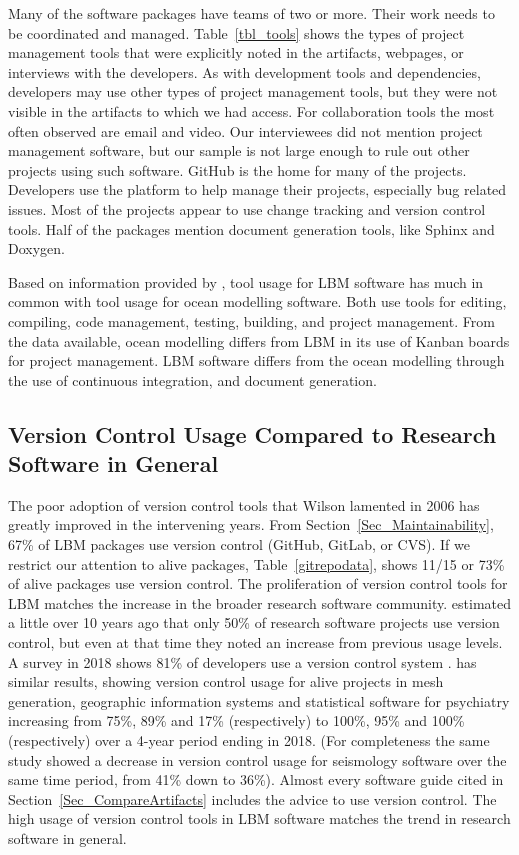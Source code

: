 \documentclass[final, 3p, times, authoryear]{elsarticle}
\begin{document}
Many of the software packages have teams of two or more. Their work needs to be
coordinated and managed. Table~\ref{tbl_tools} shows the types of project
management tools that were explicitly noted in the artifacts, webpages, or
interviews with the developers. As with development tools and dependencies,
developers may use other types of project management tools, but they were not
visible in the artifacts to which we had access.  For collaboration tools the
most often observed are email and video. Our interviewees did not mention
project management software, but our sample is not large enough to rule out
other projects using such software. GitHub is the home for many of the projects.
Developers use the platform to help manage their projects, especially bug
related issues. Most of the projects appear to use change tracking and version
control tools. Half of the packages mention document generation tools, like
Sphinx and Doxygen.

Based on information provided by \citet{JungEtAl2022}, tool usage for LBM
software has much in common with tool usage for ocean modelling software.  Both
use tools for editing, compiling, code management, testing, building, and
project management.  From the data available, ocean modelling differs from LBM
in its use of Kanban boards for project management. LBM software differs from
the ocean modelling through the use of continuous integration, and document
generation.

\subsection{Version Control Usage Compared to Research Software in General}

The poor adoption of version control tools that Wilson lamented in 2006
\citep{Wilson2006} has greatly improved in the intervening years.  From
Section~\ref{Sec_Maintainability}, 67\% of LBM packages use version control
(GitHub, GitLab, or CVS). If we restrict our attention to alive packages,
Table~\ref{gitrepodata}, shows 11/15 or 73\% of alive packages use version
control. The proliferation of version control tools for LBM matches the increase
in the broader research software community. \citet{Nguyen-HoanEtAl2010}
estimated a little over 10 years ago that only 50\% of research software
projects use version control, but even at that time they noted an increase from
previous usage levels. A survey in 2018 shows 81\% of developers use a version
control system \citep{AlNoamanyAndBorghi2018}. \citet{Smith2018} has similar
results, showing version control usage for alive projects in mesh generation,
geographic information systems and statistical software for psychiatry
increasing from 75\%, 89\% and 17\% (respectively) to 100\%, 95\% and 100\%
(respectively) over a 4-year period ending in 2018.  (For completeness the same
study showed a decrease in version control usage for seismology software over
the same time period, from 41\% down to 36\%).  Almost every software guide
cited in Section~\ref{Sec_CompareArtifacts} includes the advice to use version
control. The high usage of version control tools in LBM software matches the
trend in research software in general.
\end{document}
